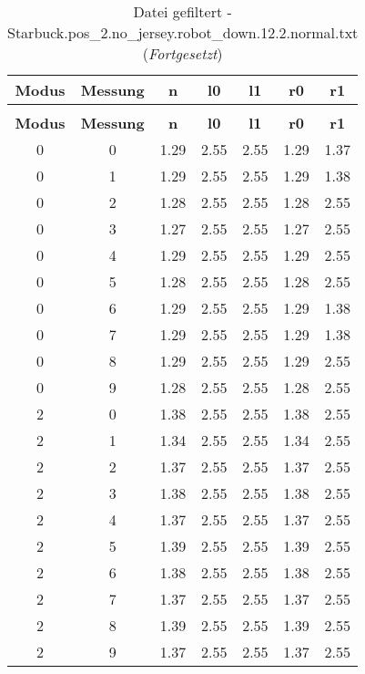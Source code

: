 \begin{longtable}{|c|c||c||c|c||c|c|}
	\caption{Datei gefiltert - Starbuck.pos\_2.no\_jersey.robot\_down.12.2.normal.txt} \label{tab:Starbuck.pos-2.no-jersey.robot-down.12.2.normal.txt} \\ \hline
	\textbf{Modus} & \textbf{Messung} & \textbf{n} & \textbf{l0} & \textbf{l1} & \textbf{r0} & \textbf{r1}\\ \hline
	\endfirsthead
	\caption[]{Datei gefiltert - Starbuck.pos\_2.no\_jersey.robot\_down.12.2.normal.txt (\emph{Fortgesetzt})} \\ \hline
	\textbf{Modus} & \textbf{Messung} & \textbf{n} & \textbf{l0} & \textbf{l1} & \textbf{r0} & \textbf{r1}\\ \hline
	\endhead
	0 & 0 & 1.29 & 2.55 & 2.55 & 1.29 & 1.37 \\ \hline
	0 & 1 & 1.29 & 2.55 & 2.55 & 1.29 & 1.38 \\ \hline
	0 & 2 & 1.28 & 2.55 & 2.55 & 1.28 & 2.55 \\ \hline
	0 & 3 & 1.27 & 2.55 & 2.55 & 1.27 & 2.55 \\ \hline
	0 & 4 & 1.29 & 2.55 & 2.55 & 1.29 & 2.55 \\ \hline
	0 & 5 & 1.28 & 2.55 & 2.55 & 1.28 & 2.55 \\ \hline
	0 & 6 & 1.29 & 2.55 & 2.55 & 1.29 & 1.38 \\ \hline
	0 & 7 & 1.29 & 2.55 & 2.55 & 1.29 & 1.38 \\ \hline
	0 & 8 & 1.29 & 2.55 & 2.55 & 1.29 & 2.55 \\ \hline
	0 & 9 & 1.28 & 2.55 & 2.55 & 1.28 & 2.55 \\ \hline
	2 & 0 & 1.38 & 2.55 & 2.55 & 1.38 & 2.55 \\ \hline
	2 & 1 & 1.34 & 2.55 & 2.55 & 1.34 & 2.55 \\ \hline
	2 & 2 & 1.37 & 2.55 & 2.55 & 1.37 & 2.55 \\ \hline
	2 & 3 & 1.38 & 2.55 & 2.55 & 1.38 & 2.55 \\ \hline
	2 & 4 & 1.37 & 2.55 & 2.55 & 1.37 & 2.55 \\ \hline
	2 & 5 & 1.39 & 2.55 & 2.55 & 1.39 & 2.55 \\ \hline
	2 & 6 & 1.38 & 2.55 & 2.55 & 1.38 & 2.55 \\ \hline
	2 & 7 & 1.37 & 2.55 & 2.55 & 1.37 & 2.55 \\ \hline
	2 & 8 & 1.39 & 2.55 & 2.55 & 1.39 & 2.55 \\ \hline
	2 & 9 & 1.37 & 2.55 & 2.55 & 1.37 & 2.55 \\ \hline

\end{longtable}
